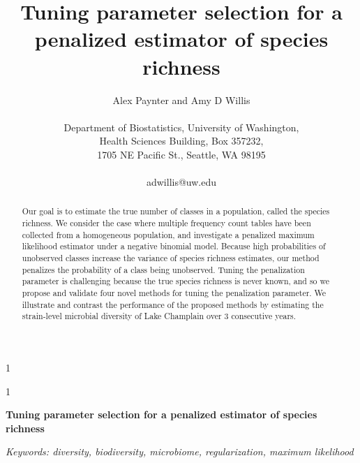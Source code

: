 \documentclass[12pt]{article}
\theoremstyle{break}
\theoremstyle{break}
\newcommand{\blind}{1}
\begin{document}
%

\def\spacingset#1{\renewcommand{\baselinestretch}%
{#1}\small\normalsize} \spacingset{1}



\blind
{
  \title{\bf Tuning parameter selection for a penalized estimator of species richness}
  \author{Alex Paynter and Amy D Willis\\ \\
  Department of Biostatistics, University of Washington,\\
  Health Sciences Building, Box 357232,\\
  1705 NE Pacific St., Seattle, WA 98195 \\ \\
  adwillis@uw.edu}

  \maketitle
} \fi

\blind
{
  \bigskip
  \bigskip
  \bigskip
  \begin{center}
    {\LARGE\bf Tuning parameter selection for a penalized estimator of species richness}
\end{center}
  \medskip
} \fi

\bigskip
\begin{abstract}
  Our goal is to estimate the true number of classes in a population, called the species richness.  We consider the case where multiple frequency count tables have been collected from a homogeneous population, and investigate a penalized maximum likelihood estimator under a negative binomial model.
  Because high probabilities of unobserved classes increase the variance of species richness estimates,
  our method penalizes the probability of a class being unobserved. Tuning the penalization parameter is challenging because the true species richness is never known, and so we propose and validate four novel methods for tuning the penalization parameter.  We illustrate and contrast the performance of the proposed methods by estimating the strain-level microbial diversity of Lake Champlain over 3 consecutive years.
\end{abstract}

\noindent%
{\it Keywords: diversity, biodiversity, microbiome, regularization, maximum likelihood}
\vfill

\newpage
\spacingset{1.45} %
\end{document}
